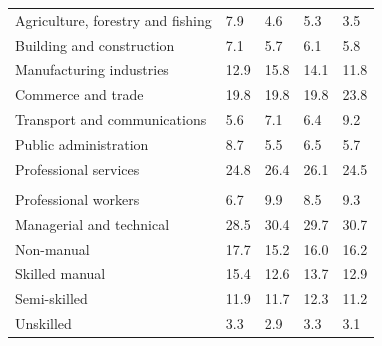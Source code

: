 \documentclass{article}
\begin{document}
\begin{table}[h]
\begin{tabular}{KTTTT}
    \hline
Agriculture, forestry and fishing  & 7.9& 4.6& 5.3& 3.5\\
Building and construction & 7.1& 5.7& 6.1& 5.8\\
Manufacturing industries & 12.9& 15.8& 14.1& 11.8\\
Commerce and trade  & 19.8& 19.8& 19.8& 23.8\\
Transport and communications  & 5.6& 7.1& 6.4& 9.2\\
Public administration & 8.7& 5.5& 6.5& 5.7\\
Professional services & 24.8& 26.4& 26.1& 24.5\\
\hline
    \\ 
    \hline
Professional workers  & 6.7& 9.9 & 8.5& 9.3\\
Managerial and technical & 28.5& 30.4& 29.7& 30.7\\
Non-manual & 17.7& 15.2& 16.0& 16.2\\
Skilled manual & 15.4& 12.6& 13.7& 12.9\\
Semi-skilled & 11.9& 11.7& 12.3& 11.2\\
Unskilled  & 3.3& 2.9& 3.3& 3.1\\
\end{tabular}
\end{table}
\pagebreak
\end{document}
